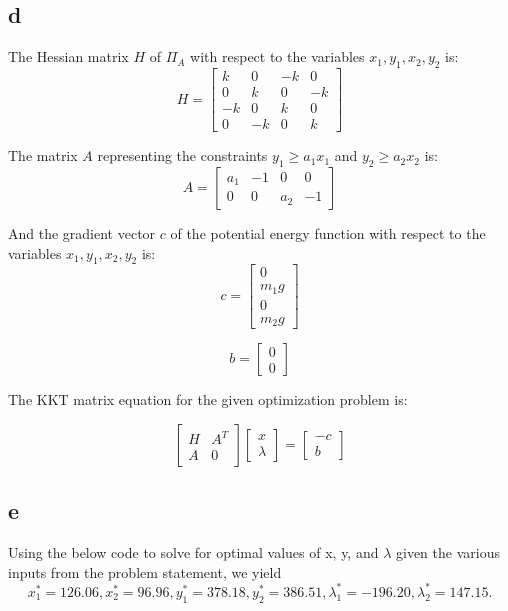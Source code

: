 \documentclass[10pt]{article}
\begin{document}
\subsection{d}

The Hessian matrix \( H \) of \( \Pi_A \) with respect to the variables \( x_1, y_1, x_2, y_2 \) is:
\[
H = \begin{bmatrix}
k & 0 & -k & 0 \\
0 & k & 0 & -k \\
-k & 0 & k & 0 \\
0 & -k & 0 & k
\end{bmatrix}
\]

The matrix \( A \) representing the constraints \( y_1 \geq a_1x_1 \) and \( y_2 \geq a_2x_2 \) is:
\[
A = \begin{bmatrix}
a_1 & -1 & 0 & 0 \\
0 & 0 & a_2 & -1
\end{bmatrix}
\]

And the gradient vector \( c \) of the potential energy function with respect to the variables \( x_1, y_1, x_2, y_2 \) is:
\[
c = \begin{bmatrix}
0 \\
m_1g \\
0 \\
m_2g
\end{bmatrix}
\]

\[
b= \begin{bmatrix}
0\\
0
\end{bmatrix}
\]

The KKT matrix equation for the given optimization problem is:

\[
\begin{bmatrix}
H & A^T \\
A & 0
\end{bmatrix}
\begin{bmatrix}
x \\
\lambda
\end{bmatrix}
=
\begin{bmatrix}
-c \\
b
\end{bmatrix}
\]

\subsection{e}

Using the below code to solve for optimal values of x, y, and $\lambda$ given the various inputs from the problem statement, we yield
\[
x_1^* = 126.06, x_2^* = 96.96, y_1^* = 378.18, y_2^* = 386.51, \lambda_1^* = -196.20, \lambda_2^* = 147.15.
\]
\end{document}
